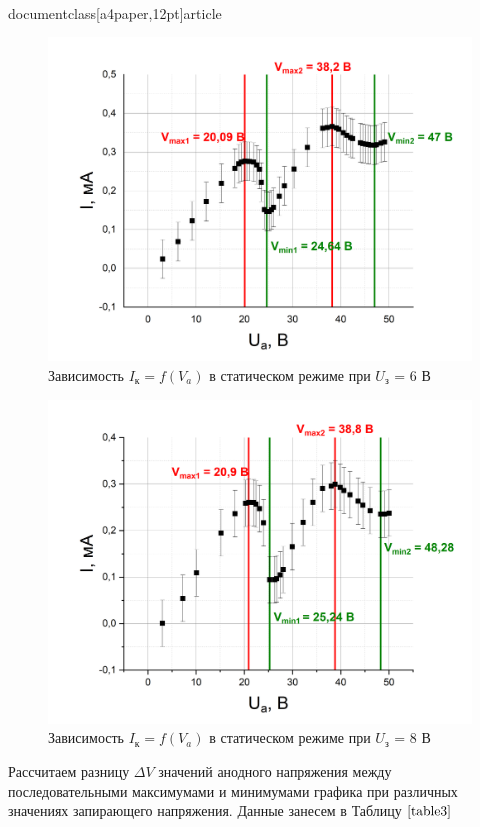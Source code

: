 \\documentclass[a4paper,12pt]{article}
\begin{document}
\begin{figure}[h!]
	\centering
	\includegraphics[scale=0.5]{graph2}
	\caption{Зависимость $I_к = f(V_a)$ в статическом режиме при $U_з$ = 6 В}
	\label{graph2}
\end{figure}

\newpage

\begin{figure}[h!]
	\centering
	\includegraphics[scale=0.5]{graph3}
	\caption{Зависимость $I_к = f(V_a)$ в статическом режиме при $U_з$ = 8 В}
	\label{graph3}
\end{figure}

Рассчитаем разницу $\Delta V$ значений анодного напряжения между последовательными максимумами и минимумами графика при различных значениях запирающего напряжения. Данные занесем в Таблицу  $\ref{table3}$
\end{document}
